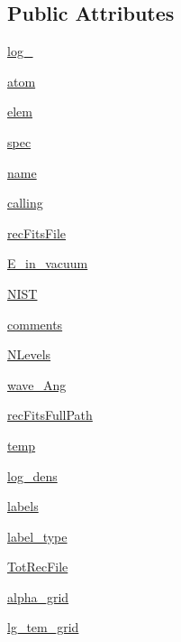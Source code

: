\subsection*{Public Attributes}
\begin{DoxyCompactItemize}
\item 
\hyperlink{classpyneb_1_1core_1_1pynebcore_1_1_rec_atom_ad901cd583cbb6a4008bc41013e16d82f}{log\-\_\-}
\item 
\hyperlink{classpyneb_1_1core_1_1pynebcore_1_1_rec_atom_a1a2aa175da6b5b8847f409e37437e3d3}{atom}
\item 
\hyperlink{classpyneb_1_1core_1_1pynebcore_1_1_rec_atom_a1325fff2854658752d522c7284df5a8a}{elem}
\item 
\hyperlink{classpyneb_1_1core_1_1pynebcore_1_1_rec_atom_ac2485287f7694915959ba49b9b82e483}{spec}
\item 
\hyperlink{classpyneb_1_1core_1_1pynebcore_1_1_rec_atom_abde95b732830df56b3d7713313f83060}{name}
\item 
\hyperlink{classpyneb_1_1core_1_1pynebcore_1_1_rec_atom_a82ec425ebba32b73a5d9ae52717d47c4}{calling}
\item 
\hyperlink{classpyneb_1_1core_1_1pynebcore_1_1_rec_atom_a2108a27da329b8599357e990a446faae}{rec\-Fits\-File}
\item 
\hyperlink{classpyneb_1_1core_1_1pynebcore_1_1_rec_atom_ad8b22dbde0d9861d94cf7aeacf0d93be}{E\-\_\-in\-\_\-vacuum}
\item 
\hyperlink{classpyneb_1_1core_1_1pynebcore_1_1_rec_atom_afe5a91d97ffefced34fb2f2c271736ec}{N\-I\-S\-T}
\item 
\hyperlink{classpyneb_1_1core_1_1pynebcore_1_1_rec_atom_ada8efc5b9724d1c0e76bd7c63508803e}{comments}
\item 
\hyperlink{classpyneb_1_1core_1_1pynebcore_1_1_rec_atom_a37c93c0fbaad583a1019f5930bc51999}{N\-Levels}
\item 
\hyperlink{classpyneb_1_1core_1_1pynebcore_1_1_rec_atom_aa2fd61021ea3067af77e7ee0053ace11}{wave\-\_\-\-Ang}
\item 
\hyperlink{classpyneb_1_1core_1_1pynebcore_1_1_rec_atom_af74fe68ebe037be119ac2f136485782b}{rec\-Fits\-Full\-Path}
\item 
\hyperlink{classpyneb_1_1core_1_1pynebcore_1_1_rec_atom_afdcfb955b81391dabcb298fe4990e33c}{temp}
\item 
\hyperlink{classpyneb_1_1core_1_1pynebcore_1_1_rec_atom_ac93e76934d279878d4f1f6d961df5488}{log\-\_\-dens}
\item 
\hyperlink{classpyneb_1_1core_1_1pynebcore_1_1_rec_atom_a0a758f4eb5a1b0780542eda87dcaeed3}{labels}
\item 
\hyperlink{classpyneb_1_1core_1_1pynebcore_1_1_rec_atom_a054cc66819a590792e6a2478136e2143}{label\-\_\-type}
\item 
\hyperlink{classpyneb_1_1core_1_1pynebcore_1_1_rec_atom_a3654e24299df680fe969486399e27880}{Tot\-Rec\-File}
\item 
\hyperlink{classpyneb_1_1core_1_1pynebcore_1_1_rec_atom_ad253222149ed56462daddaa2b9287cbb}{alpha\-\_\-grid}
\item 
\hyperlink{classpyneb_1_1core_1_1pynebcore_1_1_rec_atom_a6c6ed37093cbb2b2cf5a48df56357879}{lg\-\_\-tem\-\_\-grid}
\end{DoxyCompactItemize}
